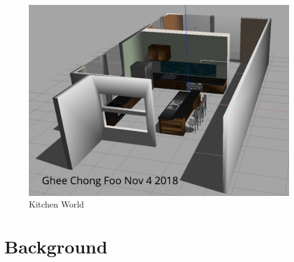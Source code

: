 \documentclass[10pt,journal,compsoc]{IEEEtran}
\begin{document}
\begin{figure}[thpb]
      \centering
      \includegraphics[width=\linewidth]{kitchen_world.png}
      \caption{Kitchen World}
      \label{fig:Kitchen}
\end{figure}






\section{Background}
\end{document}
